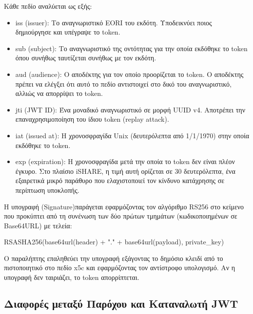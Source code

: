 Κάθε πεδίο αναλύεται ως εξής:
\begin{itemize}
    \item \textlatin{iss} (\textlatin{issuer}): Το αναγνωριστικό
    \textlatin{EORI} του εκδότη. Υποδεικνύει ποιος δημιούργησε και
    υπέγραψε το \textlatin{token}.
    \item \textlatin{sub} (\textlatin{subject}): Το αναγνωριστικό της
    οντότητας για την οποία εκδόθηκε το \textlatin{token} όπου συνήθως ταυτίζεται συνήθως με τον εκδότη.
    \item \textlatin{aud} (\textlatin{audience}): Ο αποδέκτης για τον οποίο
    προορίζεται το \textlatin{token}. Ο αποδέκτης πρέπει να ελέγξει ότι
    αυτό το πεδίο αντιστοιχεί στο δικό του αναγνωριστικό, αλλιώς να
    απορρίψει το \textlatin{token}. 
    \item \textlatin{jti} (\textlatin{JWT ID}): Ένα μοναδικό αναγνωριστικό
    σε μορφή \textlatin{UUID v4}. Αποτρέπει την επαναχρησιμοποίηση
    του ίδιου \textlatin{token} (\textlatin{replay attack}).
    \item \textlatin{iat} (\textlatin{issued at}): Η χρονοσφραγίδα
    \textlatin{Unix} (δευτερόλεπτα από 1/1/1970) στην οποία εκδόθηκε
    το \textlatin{token}.
    \item \textlatin{exp} (\textlatin{expiration}): Η χρονοσφραγίδα μετά
    την οποία το \textlatin{token} δεν είναι πλέον έγκυρο. Στο πλαίσιο
    \textlatin{iSHARE}, η τιμή αυτή ορίζεται σε 30 δευτερόλεπτα, ένα εξαιρετικά μικρό παράθυρο που ελαχιστοποιεί
    τον κίνδυνο κατάχρησης σε περίπτωση υποκλοπής.
\end{itemize}

Η υπογραφή (\textlatin{Signature})παράγεται εφαρμόζοντας τον αλγόριθμο \textlatin{RS256} στο
κείμενο που προκύπτει από τη συνένωση των δύο πρώτων τμημάτων
(κωδικοποιημένων σε \textlatin{Base64URL}) με τελεία:

\textlatin{\textlatin{RSASHA256(base64url(header) + "." + base64url(payload), private\_key)}}

Ο παραλήπτης επαληθεύει την υπογραφή εξάγοντας το δημόσιο κλειδί από
το πιστοποιητικό στο πεδίο \textlatin{x5c} και εφαρμόζοντας τον αντίστροφο
υπολογισμό. Αν η υπογραφή δεν ταιριάζει, το \textlatin{token}
απορρίπτεται.

\subsection{Διαφορές μεταξύ Παρόχου και Καταναλωτή \textlatin{JWT}}
\label{subsec:jwt-differences}

